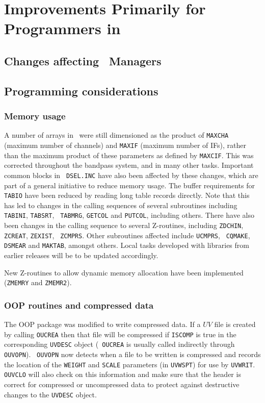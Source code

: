 \section{Improvements Primarily for Programmers in \OLDNAME}

\subsection{Changes affecting \AIPS\ Managers}

\subsection{Programming considerations}

\subsubsection{Memory usage}

A number of arrays in \AIPS\ were still dimensioned as the product of
{\tt MAXCHA} (maximum number of channels) and {\tt MAXIF} (maximum
number of IFs), rather than the maximum product of these parameters as
defined by {\tt MAXCIF}. This was corrected throughout the bandpass
system, and in many other tasks. Important common blocks in {\tt
DSEL.INC} have also been affected by these changes, which are part of
a general initiative to reduce memory usage. The buffer requirements
for {\tt TABIO} have been reduced by reading long table records
directly. Note that this has led to changes in the calling sequences
of several subroutines including {\tt TABINI}, {\tt TABSRT}, {\tt
TABMRG}, {\tt GETCOL} and {\tt PUTCOL}, including others. There have
also been changes in the calling sequence to several Z-routines,
including {\tt ZDCHIN}, {\tt ZCREAT}, {\tt ZEXIST}, {\tt
ZCMPRS}. Other subroutines affected include {\tt UCMPRS}, {\tt
CQMAKE}, {\tt DSMEAR} and {\tt MAKTAB}, amongst others. Local tasks
developed with libraries from earlier releases will be to be updated
accordingly.

New Z-routines to allow dynamic memory allocation have been
implemented ({\tt ZMEMRY} and {\tt ZMEMR2}).

\subsubsection{OOP routines and compressed data}

The OOP package was modified to write compressed data.  If a $UV$ file
is created by calling {\tt OUCREA} then that file will be compressed
if {\tt ISCOMP} is true in the corresponding {\tt UVDESC} object ({\tt
OUCREA} is usually called indirectly through {\tt OUVOPN}).  {\tt
OUVOPN} now detects when a file to be written is compressed and
records the location of the {\tt WEIGHT} and {\tt SCALE} parameters
(in {\tt UVWSPT}) for use by {\tt UVWRIT}.  {\tt OUVCLO} will also
check on this information and make sure that the header is correct for
compressed or uncompressed data to protect against destructive changes
to the {\tt UVDESC} object.

